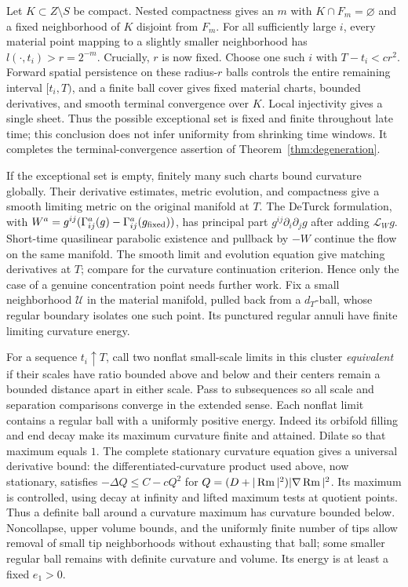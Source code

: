 Let $K\subset Z\setminus S$ be compact. Nested compactness gives
an $m$ with $K\cap F_m=\varnothing$ and a fixed neighborhood of
$K$ disjoint from $F_m$. For all sufficiently large $i$, every
material point mapping to a slightly smaller neighborhood has
$l(\cdot,t_i)>r=2^{-m}$. Crucially, $r$ is now fixed. Choose one
such $i$ with $T-t_i<c r^2$. Forward spatial persistence on these
radius-$r$ balls controls the entire remaining interval $[t_i,T)$,
and a finite ball cover gives fixed material charts, bounded
derivatives, and smooth terminal convergence over $K$. Local
injectivity gives a single sheet. Thus the possible exceptional
set is fixed and finite throughout late time; this conclusion does
not infer uniformity from shrinking time windows. It completes the
terminal-convergence assertion of Theorem~\ref{thm:degeneration}.

If the exceptional set is empty, finitely many such charts bound
curvature globally. Their derivative estimates, metric evolution,
and compactness give a smooth limiting metric on the original
manifold at $T$. The DeTurck formulation, with
$W^a=g^{ij}(\Gamma^a_{ij}(g)-\Gamma^a_{ij}(g_{\rm fixed}))$,
has principal part $g^{ij}\partial_i\partial_jg$ after adding
$\mathcal L_Wg$. Short-time quasilinear parabolic existence and
pullback by $-W$ continue the flow on the same manifold. The smooth
limit and evolution equation give matching derivatives at $T$;
compare \cite[Theorem 14.1]{Hamilton1982} for the curvature continuation
criterion. Hence only the case of a genuine concentration point
needs further work. Fix a small neighborhood $\mathcal U$ in the
material manifold, pulled back from a $d_T$-ball, whose regular
boundary isolates one such point. Its punctured regular annuli have
finite limiting curvature energy.

For a sequence $t_i\uparrow T$, call two nonflat small-scale limits
in this cluster \emph{equivalent} if their scales have ratio bounded
above and below and their centers remain a bounded distance apart
in either scale. Pass to subsequences so all scale and separation
comparisons converge in the extended sense. Each nonflat limit
contains a regular ball with a uniformly positive energy. Indeed
its orbifold filling and end decay make its maximum curvature finite
and attained. Dilate so that maximum equals $1$. The complete
stationary curvature equation gives a universal derivative bound:
the differentiated-curvature product used above, now stationary,
satisfies $-\Delta Q\leq C-cQ^2$ for
$Q=(D+|\operatorname{Rm}|^2)|\nabla\operatorname{Rm}|^2$. Its maximum is controlled, using decay
at infinity and lifted maximum tests at quotient points.
Thus a definite ball around a curvature maximum has curvature
bounded below. Noncollapse, upper volume bounds, and the uniformly
finite number of tips allow removal of small tip neighborhoods
without exhausting that ball; some smaller regular ball remains
with definite curvature and volume. Its energy is at least a fixed
$e_1>0$.

